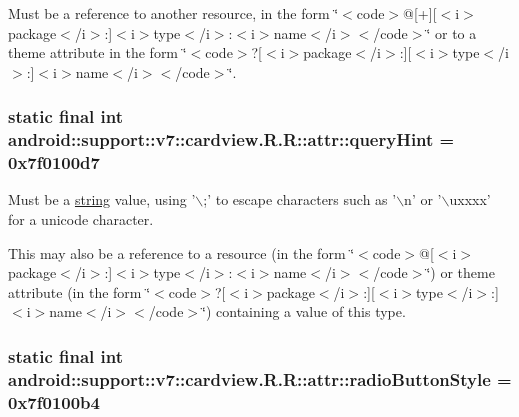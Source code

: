 Must be a reference to another resource, in the form \char`\"{}$<$code$>$@\mbox{[}+\mbox{]}\mbox{[}$<$i$>$package$<$/i$>$:\mbox{]}$<$i$>$type$<$/i$>$:$<$i$>$name$<$/i$>$$<$/code$>$\char`\"{} or to a theme attribute in the form \char`\"{}$<$code$>$?\mbox{[}$<$i$>$package$<$/i$>$:\mbox{]}\mbox{[}$<$i$>$type$<$/i$>$:\mbox{]}$<$i$>$name$<$/i$>$$<$/code$>$\char`\"{}. \hypertarget{classandroid_1_1support_1_1v7_1_1cardview_1_1_r_1_1attr_37367d17de3f034f4e3dd0d71e3a8636}{
\subsubsection[{queryHint}]{\setlength{\rightskip}{0pt plus 5cm}static final int android::support::v7::cardview.R.R::attr::queryHint = 0x7f0100d7}}
\label{classandroid_1_1support_1_1v7_1_1cardview_1_1_r_1_1attr_37367d17de3f034f4e3dd0d71e3a8636}


Must be a \hyperlink{classandroid_1_1support_1_1v7_1_1cardview_1_1_r_1_1string}{string} value, using '$\backslash$;' to escape characters such as '$\backslash$n' or '$\backslash$uxxxx' for a unicode character. 

This may also be a reference to a resource (in the form \char`\"{}$<$code$>$@\mbox{[}$<$i$>$package$<$/i$>$:\mbox{]}$<$i$>$type$<$/i$>$:$<$i$>$name$<$/i$>$$<$/code$>$\char`\"{}) or theme attribute (in the form \char`\"{}$<$code$>$?\mbox{[}$<$i$>$package$<$/i$>$:\mbox{]}\mbox{[}$<$i$>$type$<$/i$>$:\mbox{]}$<$i$>$name$<$/i$>$$<$/code$>$\char`\"{}) containing a value of this type. \hypertarget{classandroid_1_1support_1_1v7_1_1cardview_1_1_r_1_1attr_a5f87ca34ac1d9176168c35f03eb2db6}{
\subsubsection[{radioButtonStyle}]{\setlength{\rightskip}{0pt plus 5cm}static final int android::support::v7::cardview.R.R::attr::radioButtonStyle = 0x7f0100b4}}
\label{classandroid_1_1support_1_1v7_1_1cardview_1_1_r_1_1attr_a5f87ca34ac1d9176168c35f03eb2db6}


